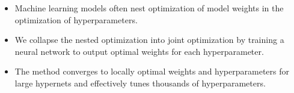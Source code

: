 \documentclass[landscape,a0b,final,a4resizeable]{include/a0poster}
\begin{document}
\begin{poster}
\vspace*{2.5cm}
\large


\begin{multicols}{3}



\begin{itemize}
	\item Machine learning models often nest optimization of model weights in the optimization of hyperparameters.
	\item We collapse the nested optimization into joint optimization by training a neural network to output optimal weights for each hyperparameter.
	\item The method converges to locally optimal weights and hyperparameters for large hypernets and effectively tunes thousands of hyperparameters.
\end{itemize}


\end{multicols}
\end{poster}
\end{document}

